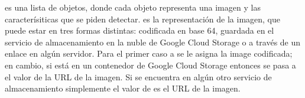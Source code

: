 \begin{sphinxVerbatim}[commandchars=\\\{\}]
    \PYG{p}{[}
        
          
          
            
            
        \PYG{p}{[}
            
            
      \PYG{p}{]}
  \PYG{p}{]}
\end{sphinxVerbatim}

 es una lista de objetos, donde cada objeto representa una imagen
y las caracterísiticas que se piden detectar.  es la representación
de la imagen, que puede estar en tres formas distintas: codificada en base 64,
guardada en el servicio de almacenamiento en la nuble de Google Cloud Storage
o a través de un enlace en algún servidor. Para el primer caso a 
se le asigna la image codificada; en cambio, si está en un contenedor de Google Cloud Storage
entonces se pasa a  el valor de la URL de la imagen. Si se encuentra
en algún otro servicio de almacenamiento simplemente el valor de 
es el URL de la imagen.

